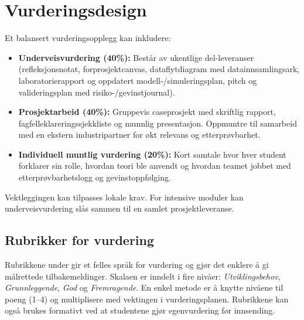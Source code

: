 \section{Vurderingsdesign}
Et balansert vurderingsopplegg kan inkludere:
\begin{itemize}
    \item \textbf{Underveisvurdering (40\%):} Består av ukentlige del-leveranser (refleksjonsnotat, forprosjektcanvas, dataflytdiagram med datainnsamlingsark, laboratorierapport og oppdatert modell-/simuleringsplan, pitch og valideringsplan med risiko-/gevinstjournal).
    \item \textbf{Prosjektarbeid (40\%):} Gruppevis caseprosjekt med skriftlig rapport, fagfelleklareringssjekkliste og munnlig presentasjon. Oppmuntre til samarbeid med en ekstern industripartner for økt relevans og etterprøvbarhet.
    \item \textbf{Individuell muntlig vurdering (20\%):} Kort samtale hvor hver student forklarer sin rolle, hvordan teori ble anvendt og hvordan teamet jobbet med etterprøvbarhetslogg og gevinstoppfølging.
\end{itemize}
Vektleggingen kan tilpasses lokale krav. For intensive moduler kan underveisvurdering slås sammen til en samlet prosjektleveranse.

\subsection{Rubrikker for vurdering}
Rubrikkene under gir et felles språk for vurdering og gjør det enklere å gi målrettede tilbakemeldinger. Skalaen er inndelt i fire nivåer:
\emph{Utviklingsbehov}, \emph{Grunnleggende}, \emph{God} og \emph{Fremragende}. En enkel metode er å knytte nivåene til poeng (1--4) og multiplisere med vektingen i vurderingsplanen. Rubrikkene kan også brukes formativt ved at studentene gjør egenvurdering før innsending.

